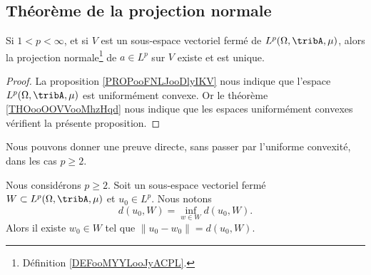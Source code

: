 	\subsection{Théorème de la projection normale}

	\begin{proposition}     \label{PROPooTZMRooCvQtGg}
		Si \( 1<p<\infty\), et si \( V\) est un sous-espace vectoriel fermé de \( L^p(\Omega,\tribA, \mu)\), alors la projection normale\footnote{Définition \ref{DEFooMYYLooJyACPL}.} de \( a\in L^p\) sur \( V\) existe et est unique.
	\end{proposition}

	\begin{proof}
		La proposition \ref{PROPooFNLJooDlyIKV} nous indique que l'espace \( L^p(\Omega,\tribA, \mu)\) est uniformément convexe. Or le théorème \ref{THOooOOVVooMhzHqd} nous indique que les espaces uniformément convexes vérifient la présente proposition.
	\end{proof}

	Nous pouvons donner une preuve directe, sans passer par l'uniforme convexité, dans les cas \( p\geq 2\).
	\begin{theorem} \label{THOooRJFUooQivDKm}
		Nous considérons \( p\geq 2\). Soit un sous-espace vectoriel fermé \( W\subset L^p(\Omega,\tribA,\mu)\) et \( u_0\in L^p\). Nous notons
		\begin{equation}
			d(u_0,W)=\inf_{w\in W}d(u_0,W).
		\end{equation}
		Alors il existe \( w_0\in W\) tel que \( \| u_0-w_0 \|=d(u_0,W)\).
	\end{theorem}

